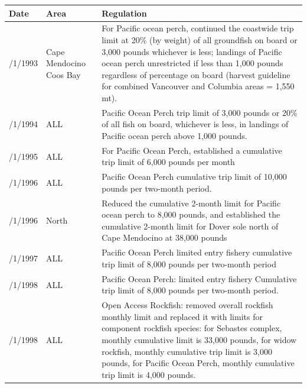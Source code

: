 \documentclass[12pt,]{article}
\begin{document}
\begin{table}[ht]
\begin{tabular}{>{\centering}p{.60in}>{\centering}p{1.0in}>{\raggedright}p{4.20in}}
   \hline
\end{tabular}
\endgroup
\end{table}\begin{table}[ht]
\centering
\begingroup\fontsize{9pt}{10pt}\selectfont
\begin{tabular}{>{\centering}p{.75in}>{\centering}p{.75in}>{\raggedright}p{4.25in}}
  \hline
Date & Area & Regulation \\ 
  \hline
1/1/1993 &  Cape Mendocino Coos Bay  &  For Pacific ocean perch, continued the coastwide trip limit at 20\% (by weight) of all groundfish on board or 3,000 pounds whichever is less; landings of Pacific ocean perch unrestricted if less than 1,000 pounds regardless of percentage on board (harvest guideline for combined Vancouver and Columbia areas = 1,550 mt). \\ 
  1/1/1994 &  ALL  &  Pacific Ocean Perch trip limit of 3,000 pounds or 20\% of all fish on board, whichever is less, in landings of Pacific ocean perch above 1,000 pounds. \\ 
  1/1/1995 &  ALL  &  For Pacific Ocean Perch, established a cumulative trip limit of 6,000 pounds per month \\ 
  1/1/1996 &  ALL  &  Pacific Ocean Perch cumulative trip limit of 10,000 pounds per two-month period. \\ 
  7/1/1996 &  4030 North  &  Reduced the cumulative 2-month limit for Pacific ocean perch to 8,000 pounds, and established the cumulative 2-month limit for Dover sole north of Cape Mendocino at 38,000 pounds \\ 
  1/1/1997 &  ALL  &  Pacific Ocean Perch  limited entry fishery cumulative trip limit of 8,000 pounds per two-month period \\ 
  1/1/1998 &  ALL  &  Pacific Ocean Perch:  limited entry fishery Cumulative trip limit of 8,000 pounds per two-month period. \\ 
  7/1/1998 &  ALL  &  Open Access Rockfish: removed overall rockfish monthly limit and replaced it with limits for component rockfish species: for Sebastes complex, monthly cumulative limit is 33,000 pounds, for widow rockfish, monthly cumulative trip limit is 3,000 pounds, for Pacific Ocean Perch, monthly cumulative trip limit is 4,000 pounds. \\ 

\end{tabular}
\end{table}
\end{document}
